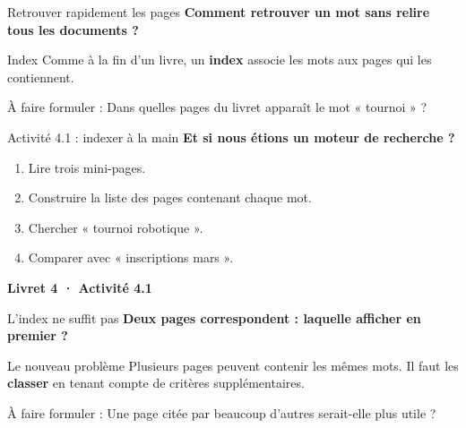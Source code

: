 \documentclass[aspectratio=169,11pt]{beamer}
\newcommand{\question}[1]{{\Large\color{or}\bfseries #1}}
\newcommand{\reperes}[1]{\vfill{\color{rose}\footnotesize À faire formuler : }{\footnotesize #1}}
\begin{document}
\begin{frame}{Retrouver rapidement les pages}
\question{Comment retrouver un mot sans relire tous les documents ?}
\vspace{2mm}
\begin{center}
\end{center}
\pause
\begin{block}{Index}
Comme à la fin d'un livre, un \textbf{index} associe les mots aux pages qui les contiennent.
\end{block}
\reperes{Dans quelles pages du livret apparaît le mot « tournoi » ?}
\end{frame}

\begin{frame}{Activité 4.1 : indexer à la main}
\question{Et si nous étions un moteur de recherche ?}
\vspace{6mm}
\begin{enumerate}\setlength{\itemsep}{5mm}
\item Lire trois mini-pages.
\item Construire la liste des pages contenant chaque mot.
\item Chercher « tournoi robotique ».
\item Comparer avec « inscriptions mars ».
\end{enumerate}
\vfill
\begin{center}{\Large\color{or}\bfseries Livret 4 · Activité 4.1}\end{center}
\end{frame}

\begin{frame}{L'index ne suffit pas}
\question{Deux pages correspondent : laquelle afficher en premier ?}
\vspace{5mm}
\begin{center}
\end{center}
\vspace{5mm}
\pause
\begin{block}{Le nouveau problème}
Plusieurs pages peuvent contenir les mêmes mots. Il faut les \textbf{classer} en tenant compte de critères supplémentaires.
\end{block}
\reperes{Une page citée par beaucoup d'autres serait-elle plus utile ?}
\end{frame}
\end{document}
